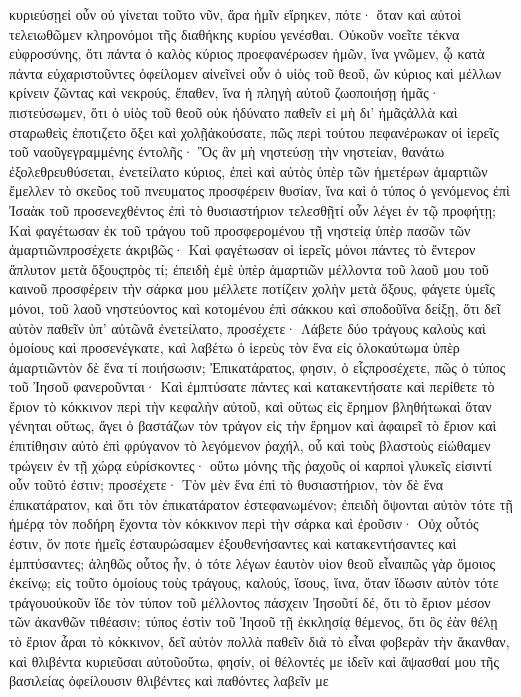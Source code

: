 κυριεύσῃεἰ οὖν οὐ γίνεται τοῦτο νῦν, ἄρα ἡμῖν εἴρηκεν, πότε· ὅταν καὶ αὐτοὶ τελειωθῶμεν κληρονόμοι τῆς διαθήκης κυρίου γενέσθαι.
Οὐκοῦν νοεῖτε τέκνα εὐφροσύνης, ὅτι πάντα ὁ καλὸς κύριος προεφανέρωσεν ἡμῶν, ἵνα γνῶμεν, ᾧ κατὰ πάντα εὐχαριστοῦντες ὀφείλομεν αἰνεῖνεἰ οὖν ὁ υἱὸς τοῦ θεοῦ, ὢν κύριος καὶ μέλλων κρίνειν ζῶντας καὶ νεκρούς, ἔπαθεν, ἵνα ἡ πληγὴ αὐτοῦ ζωοποιήσῃ ἡμᾶς· πιστεύσωμεν, ὅτι ὁ υἱὸς τοῦ θεοῦ οὐκ ἠδύνατο παθεῖν εἰ μὴ δι’ ἡμᾶςἀλλὰ καὶ σταρωθεὶς ἐποτιζετο ὄξει καὶ χολῇἀκούσατε, πῶς περὶ τούτου πεφανέρωκαν οἱ ἱερεῖς τοῦ ναοῦγεγραμμένης ἐντολῆς· Ὃς ἂν μὴ νηστεύσῃ τὴν νηστείαν, θανάτω ἐξολεθρευθύσεται, ἐνετείλατο κύριος, ἐπεὶ καὶ αὐτὸς ὑπὲρ τῶν ἡμετέρων ἁμαρτιῶν ἔμελλεν τὸ σκεῦος τοῦ πνευματος προσφέρειν θυσίαν, ἵνα καὶ ὁ τύπος ὁ γενόμενος ἐπὶ Ἰσαὰκ τοῦ προσενεχθέντος ἐπὶ τὸ θυσιαστήριον τελεσθῇτί οὖν λέγει ἐν τῷ προφήτῃ; Καὶ φαγέτωσαν ἐκ τοῦ τράγου τοῦ προσφερομένου τῇ νηστείᾳ ὑπὲρ πασῶν τῶν ἁμαρτιῶνπροσέχετε ἀκριβῶς· Καὶ φαγέτωσαν οἱ ἱερεῖς μόνοι πάντες τὸ ἔντερον ἄπλυτον μετὰ ὄξουςπρὸς τί; ἐπειδὴ ἐμὲ ὑπὲρ ἁμαρτιῶν μέλλοντα τοῦ λαοῦ μου τοῦ καινοῦ προσφέρειν τὴν σάρκα μου μέλλετε ποτίζειν χολὴν μετὰ ὄξους, φάγετε ὑμεῖς μόνοι, τοῦ λαοῦ νηστεύοντος καὶ κοτομένου ἐπὶ σάκκου καὶ σποδοῦἵνα δείξῃ, ὅτι δεῖ αὐτὸν παθεῖν ὑπ’ αὐτῶνἃ ἐνετείλατο, προσέχετε· Λάβετε δύο τράγους καλοὺς καὶ ὁμοίους καὶ προσενέγκατε, καὶ λαβέτω ὁ ἱερεὺς τὸν ἕνα εἰς ὁλοκαύτωμα ὑπὲρ ἁμαρτιῶντὸν δὲ ἕνα τί ποιήσωσιν; Ἐπικατάρατος, φησιν, ὁ εἷςπροσέχετε, πῶς ὁ τύπος τοῦ Ἰησοῦ φανεροῦνται· Καὶ ἐμπτύσατε πάντες καὶ κατακεντήσατε καὶ περίθετε τὸ ἔριον τὸ κόκκινον περὶ τὴν κεφαλὴν αὐτοῦ, καὶ οὕτως εἰς ἔρημον βληθήτωκαὶ ὅταν γένηται οὕτως, ἄγει ὁ βαστάζων τὸν τράγον εἰς τὴν ἔρημον καὶ ἀφαιρεῖ τὸ ἔριον καὶ ἐπιτίθησιν αὐτὸ ἐπὶ φρύγανον τὸ λεγόμενον ῥαχήλ, οὗ καὶ τοὺς βλαστοὺς εἰώθαμεν τρώγειν ἐν τῇ χώρᾳ εὑρίσκοντες· οὕτω μόνης τῆς ῥαχοῦς οἱ καρποὶ γλυκεῖς εἰσιντί οὖν τοῦτό ἐστιν; προσέχετε· Τὸν μὲν ἕνα ἐπὶ τὸ θυσιαστήριον, τὸν δὲ ἕνα ἐπικατάρατον, καὶ ὅτι τὸν ἐπικατάρατον ἐστεφανωμένον; ἐπειδὴ ὄψονται αὐτὸν τότε τῇ ἡμέρᾳ τὸν ποδήρη ἔχοντα τὸν κόκκινον περὶ τὴν σάρκα καὶ ἐροῦσιν· Οὐχ οὗτός ἐστιν, ὅν ποτε ἡμεῖς ἐσταυρώσαμεν ἐξουθενήσαντες καὶ κατακεντήσαντες καὶ ἐμπτύσαντες; ἀληθῶς οὗτος ἦν, ὁ τότε λέγων ἑαυτὸν υἱον θεοῦ εἶναιπῶς γὰρ ὅμοιος ἐκείνῳ; εἰς τοῦτο ὁμοίους τοὺς τράγους, καλούς, ἴσους, ἵινα, ὅταν ἴδωσιν αὐτὸν τότε τράγουοὐκοῦν ἴδε τὸν τύπον τοῦ μέλλοντος πάσχειν Ἰησοῦτί δέ, ὅτι τὸ ἔριον μέσον τῶν ἀκανθῶν τιθέασιν; τύπος ἐστὶν τοῦ Ἰησοῦ τῇ ἐκκλησίᾳ θέμενος, ὅτι ὃς ἐὰν θέλῃ τὸ ἔριον ἆραι τὸ κόκκινον, δεῖ αὐτὸν πολλὰ παθεῖν διὰ τὸ εἶναι φοβερὰν τὴν ἄκανθαν, καὶ θλιβέντα κυριεῦσαι αὐτοῦοὕτω, φησίν, οἱ θέλοντές με ἰδεῖν καὶ ἅψασθαί μου τῆς βασιλείας ὀφείλουσιν θλιβέντες καὶ παθόντες λαβεῖν με
